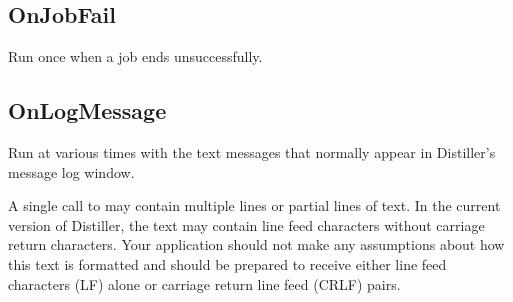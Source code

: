 \documentclass[letterpaper,12pt,english,openany,oneside]{sphinxmanual}
\begin{document}
\begin{sphinxVerbatim}[commandchars=\\\{\}]
    
       
\end{sphinxVerbatim}




\subsection{OnJobFail}
\label{\detokenize{Distiller_AutomationIntro:onjobfail}}
Run once when a job ends unsuccessfully.


\begin{sphinxVerbatim}[commandchars=\\\{\}]
    
       
\end{sphinxVerbatim}




\subsection{OnLogMessage}
\label{\detokenize{Distiller_AutomationIntro:onlogmessage}}
Run at various times with the text messages that normally appear in Distiller’s message log window.

A single call to  may contain multiple lines or partial lines of text. In the current version of Distiller, the text may contain line feed characters without carriage return characters. Your application should not make any assumptions about how this text is formatted and should be prepared to receive either line feed characters (LF) alone or carriage return \sphinxhyphen{} line feed (CR\sphinxhyphen{}LF) pairs.


\begin{sphinxVerbatim}[commandchars=\\\{\}]
     
\end{sphinxVerbatim}
\end{document}
